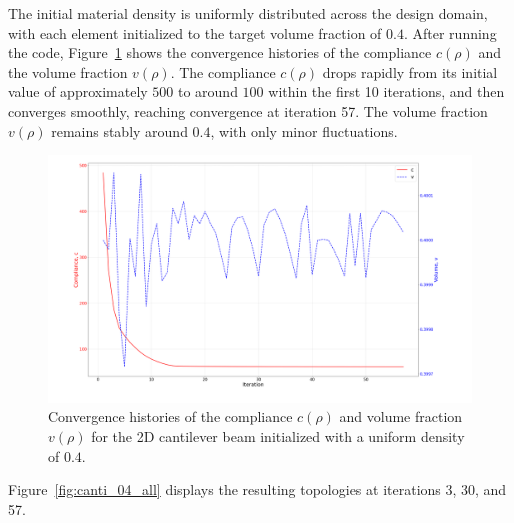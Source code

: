 \documentclass[mathpazo]{cicp}
\begin{document}
The initial material density is uniformly distributed across the design domain, with each element initialized to the target volume fraction of $0.4$. After running the code, Figure~\ref{fig:canti_04_convergence} shows the convergence histories of the compliance $c(\rho)$ and the volume fraction $v(\rho)$. The compliance $c(\rho)$ drops rapidly from its initial value of approximately $500$ to around $100$ within the first 10 iterations, and then converges smoothly, reaching convergence at iteration 57. The volume fraction $v(\rho)$ remains stably around $0.4$, with only minor fluctuations.
\begin{figure}[htp]
	\centering
	\includegraphics[width=1.0\textwidth]{figures/cantilever_2d_04_convergence.png}
	\caption{Convergence histories of the compliance $c(\rho)$ and volume fraction $v(\rho)$ for the 2D cantilever beam initialized with a uniform density of $0.4$.}
	\label{fig:canti_04_convergence}
\end{figure}

Figure~\ref{fig:canti_04_all} displays the resulting topologies at iterations 3, 30, and 57.
\end{document}
